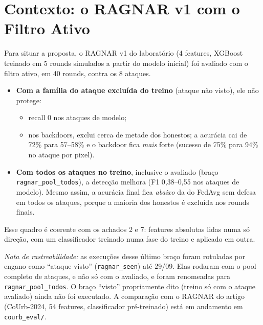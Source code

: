 \documentclass[11pt,a4paper]{article}
\begin{document}
\section{Contexto: o RAGNAR v1 com o Filtro Ativo}
\label{sec:ragnar}
Para situar a proposta, o RAGNAR v1 do laboratório (4 features, XGBoost treinado em 5 rounds simulados a
partir do modelo inicial) foi avaliado com o filtro ativo, em 40 rounds, contra os 8 ataques.
\begin{itemize}
  \item \textbf{Com a família do ataque excluída do treino} (ataque não visto), ele não protege:
        \begin{itemize}
          \item recall 0 nos ataques de modelo;
          \item nos backdoors, exclui cerca de metade dos honestos; a acurácia cai de 72\% para 57--58\% e
                o backdoor fica \emph{mais} forte (sucesso de 75\% para 94\% no ataque por pixel).
        \end{itemize}
  \item \textbf{Com todos os ataques no treino}, inclusive o avaliado (braço
        \texttt{ragnar\_pool\_todos}), a detecção melhora (F1 0,38--0,55 nos ataques de modelo). Mesmo
        assim, a acurácia final fica \emph{abaixo} da do FedAvg sem defesa em todos os ataques, porque a
        maioria dos honestos é excluída nos rounds finais.
\end{itemize}
Esse quadro é coerente com os achados 2 e 7: features absolutas lidas numa só direção, com um
classificador treinado numa fase do treino e aplicado em outra.

\emph{Nota de rastreabilidade:} as execuções desse último braço foram rotuladas por engano como
``ataque visto'' (\texttt{ragnar\_seen}) até 29/09. Elas rodaram com o pool completo de ataques, e não só
com o avaliado, e foram renomeadas para \texttt{ragnar\_pool\_todos}. O braço ``visto'' propriamente dito
(treino só com o ataque avaliado) ainda não foi executado. A comparação com o RAGNAR do artigo
(CoUrb-2024, 54 features, classificador pré-treinado) está em andamento em \texttt{courb\_eval/}.

\end{document}

